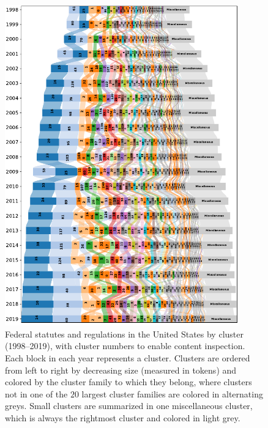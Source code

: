 \documentclass[utf8,sort&compress,numbers,square,table,hidelinks]{frontiers_suppmat} %
\begin{document}
\begin{figure}
	\centering
	\vspace*{-12pt}\includegraphics[width=0.9\textwidth]{figure_si_sankey_us.pdf}
	\caption{%
		Federal statutes and regulations in the United States by cluster (1998--2019), 
		with cluster numbers to enable content inspection. 
		Each block in each year represents a cluster. 
		Clusters are ordered from left to right by decreasing size (measured in tokens) and colored by the cluster family to which they belong, 
		where clusters not in one of the $20$ largest cluster families are colored in alternating greys. 
		Small clusters are summarized in one miscellaneous cluster, which is always the rightmost cluster and colored in light grey.
	}
	\label{fig:sankey-us-labels}
\end{figure}
\end{document}
